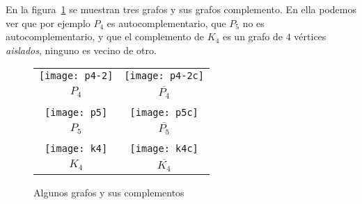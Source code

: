 \begin{ejemplo}
En la figura~\ref{fig:complementos} se muestran tres grafos y sus grafos complemento.
En ella podemos ver que por ejemplo $P_4$ es autocomplementario, que $P_5$ no es autocomplementario, y que el complemento de $K_4$ es un grafo de $4$ vértices \emph{aislados}, ninguno es vecino de otro.
\begin{figure}[h!]
\centering
\begin{tabular}{cc}
\texttt{[image: p4-2]}\hspace*{3em} &  \texttt{[image: p4-2c]} \\
$P_4$\hspace*{3em} & $\overline{P_4}$ \\
& \\
\texttt{[image: p5]}\hspace*{3em} &  \texttt{[image: p5c]} \\
$P_5$\hspace*{3em} & $\overline{P_5}$ \\
& \\
\texttt{[image: k4]}\hspace*{3em} &  \texttt{[image: k4c]} \\
$K_4$\hspace*{3em} & $\overline{K_4}$
\end{tabular}
\caption{Algunos grafos y sus complementos}
\label{fig:complementos}
\end{figure}
\end{ejemplo}

